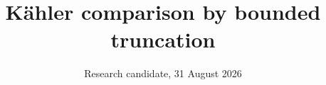 \documentclass[11pt]{article}
\begin{document}
\title{K\"ahler comparison by bounded truncation}
\author{}
\date{Research candidate, 31 August 2026}
\maketitle




\end{document}
